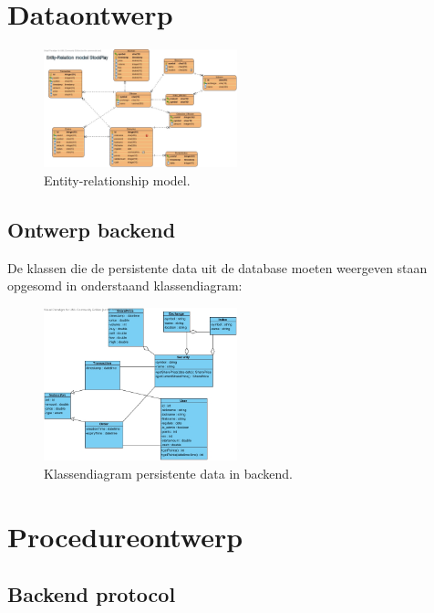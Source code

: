 \chapter{Dataontwerp}

\begin{figure}[h!]
	\centering
		\includegraphics[width=0.5\textwidth]{images/realisatie/ER_Diagram}
	\caption{Entity-relationship model.}
\end{figure}

\section{Ontwerp backend}
De klassen die de persistente data uit de database moeten weergeven staan opgesomd in onderstaand klassendiagram:

\begin{figure}[h!]
	\centering
		\includegraphics[width=0.5\textwidth]{images/realisatie/Class_Diagram}
	\caption{Klassendiagram persistente data in backend.}
\end{figure}


\chapter{Procedureontwerp}

\section{Backend protocol}

